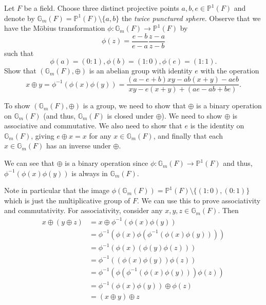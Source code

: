 \documentclass[12 pt, letterpaper]{hmcpset}
\begin{document}
\begin{problem}[Problem 1.]
	Let $F$ be a field. Choose three distinct projective points  $a, b, e \in \mathbb{P}^{1}(F)$ and denote by $\mathbb{G}_{m}(F) = \mathbb{P}^{1}(F) \setminus \{ a, b \}$ the \emph{twice punctured sphere}. Observe that we have the M\"{o}bius transformation $\phi : \mathbb{G}_{m}(F) \to \mathbb{P}^{1}(F)$ by
	\[
		\phi(z) = \frac{e - b}{e - a} \frac{z - a}{z - b}
	\]
	such that
	\[
		\phi(a) = (0 : 1), \phi(b) = (1 : 0), \phi(e) = (1 : 1).
	\]
	Show that $(\mathbb{G}_{m}(F), \oplus)$ is an abelian group with identity $e$ with the operation
	\[
		x \oplus y = \phi^{-1}(\phi(x) \phi(y)) = \frac{(a - e + b)xy - ab(x + y) - a e b}{xy - e(x + y) + (a e - a b + b e)}.
	\]
\end{problem}

\begin{solution}
	To show $(\mathbb{G}_{m}(F), \oplus)$ is a group, we need to show that $\oplus$ is a binary operation on $\mathbb{G}_{m}(F)$ (and thus, $\mathbb{G}_{m}(F)$ is closed under $\oplus$). We need to show $\oplus$ is associative and commutative. We also need to show that $e$ is the identity on $\mathbb{G}_{m}(F)$, giving  $e \oplus x = x$ for any $x \in \mathbb{G}_{m}(F)$, and finally that each $x \in \mathbb{G}_{m}(F)$ has an inverse under $\oplus$.

	We can see that $\oplus$ is a binary operation since  $\phi : \mathbb{G}_{m}(F) \to \mathbb{P}^{1}(F)$ and thus, $\phi^{-1}(\phi(x) \phi(y))$ is always in  $\mathbb{G}_{m}(F)$.

	Note in particular that the image $\phi(\mathbb{G}_{m}(F)) = \mathbb{P}^{1}(F) \setminus \{ (1 : 0), (0 : 1) \}$ which is just the multiplicative group of $F$. We can use this to prove associativity and commutativity. For associativity, consider any $x, y, z \in \mathbb{G}_{m}(F)$. Then
	\[
		\begin{split}
			x \oplus (y \oplus z) & = x \oplus \phi^{-1}(\phi(x) \phi(y)) \\
					      & = \phi^{-1}(\phi(x) \phi(\phi^{-1}(\phi(x) \phi(y)))) \\
					      & = \phi^{-1}(\phi(x) (\phi(y) \phi(z))) \\
					      & = \phi^{-1}((\phi(x) \phi(y)) \phi(z)) \\
					      & = \phi^{-1}(\phi(\phi^{-1}(\phi(x) \phi(y))) \phi(z)) \\
					      & = \phi^{-1}(\phi(x) \phi(y)) \oplus \phi(z) \\
					      & = (x \oplus y) \oplus z
		\end{split}
	\]


\end{solution}
\end{document}
